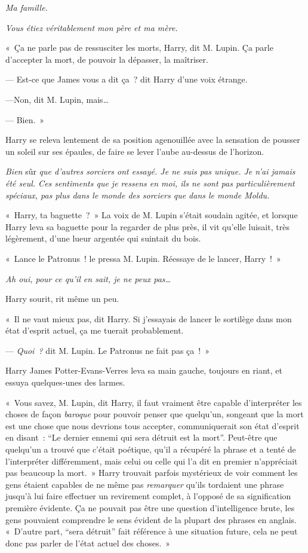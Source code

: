\emph{Ma famille.}

\emph{Vous étiez véritablement mon père et ma mère.}

«~Ça ne parle pas de ressusciter les morts, Harry, dit M. Lupin. Ça parle d'accepter la mort, de pouvoir la dépasser, la maîtriser.

--- Est-ce que James vous a dit ça~? dit Harry d'une voix étrange.

---Non, dit M. Lupin, mais…

--- Bien.~»

Harry se releva lentement de sa position agenouillée avec la sensation de pousser un soleil sur ses épaules, de faire se lever l'aube au-dessus de l'horizon.

\emph{Bien} sûr \emph{que d'autres sorciers ont essayé. Je ne suis pas unique. Je n'ai jamais été seul. Ces sentiments que je ressens en moi, ils ne sont pas particulièrement spéciaux, pas plus dans le monde des sorciers que dans le monde Moldu.}

«~Harry, ta baguette~?~» La voix de M. Lupin s'était soudain agitée, et lorsque Harry leva sa baguette pour la regarder de plus près, il vit qu'elle luisait, très légèrement, d'une lueur argentée qui suintait du bois.

«~Lance le Patronus~! le pressa M. Lupin. Réessaye de le lancer, Harry~!~»

\emph{Ah oui, pour ce qu'il en sait, je ne peux pas…}

Harry sourit, rit même un peu.

«~Il ne vaut mieux pas, dit Harry. Si j'essayais de lancer le sortilège dans mon état d'esprit actuel, ça me tuerait probablement.

--- \emph{Quoi~?} dit M. Lupin. Le Patronus ne fait pas ça~!~»

Harry James Potter-Evans-Verres leva sa main gauche, toujours en riant, et essuya quelques-unes des larmes.

«~Vous savez, M. Lupin, dit Harry, il faut vraiment être capable d'interpréter les choses de façon \emph{baroque} pour pouvoir penser que quelqu'un, songeant que la mort est une chose que nous devrions tous accepter, communiquerait son état d'esprit en disant~: “Le dernier ennemi qui sera détruit est la mort”. Peut-être que quelqu'un a trouvé que c'était poétique, qu'il a récupéré la phrase et a tenté de l'interpréter différemment, mais celui ou celle qui l'a dit en premier n'appréciait pas beaucoup la mort.~» Harry trouvait parfois mystérieux de voir comment les gens étaient capables de ne même pas \emph{remarquer} qu'ils tordaient une phrase jusqu'à lui faire effectuer un revirement complet, à l'opposé de sa signification première évidente. Ça ne pouvait pas être une question d'intelligence brute, les gens pouvaient comprendre le sens évident de la plupart des phrases en anglais. «~D'autre part, “sera détruit” fait référence à une situation future, cela ne peut donc pas parler de l'état actuel des choses.~»


